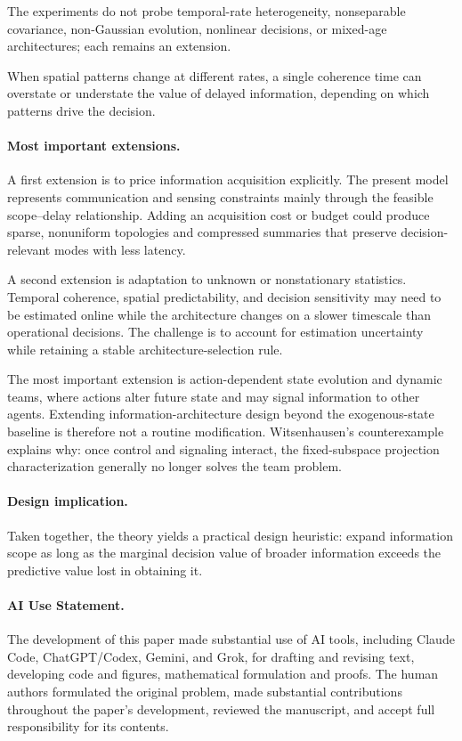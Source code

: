 \documentclass[11pt]{article}
\begin{document}
The experiments do not probe temporal-rate heterogeneity, nonseparable
covariance, non-Gaussian evolution, nonlinear decisions, or mixed-age
architectures; each remains an extension.

When spatial patterns change at different rates, a single coherence time can
overstate or understate the value of delayed information, depending on which
patterns drive the decision.

\paragraph{Most important extensions.}
A first extension is to price information acquisition explicitly. The present
model represents communication and sensing constraints mainly through the
feasible scope--delay relationship. Adding an acquisition cost or budget could
produce sparse, nonuniform topologies and compressed summaries that preserve
decision-relevant modes with less latency.

A second extension is adaptation to unknown or nonstationary statistics.
Temporal coherence, spatial predictability, and decision sensitivity may need
to be estimated online while the architecture changes on a slower timescale
than operational decisions. The challenge is to account for estimation
uncertainty while retaining a stable architecture-selection rule.

The most important extension is action-dependent state evolution and dynamic
teams, where actions alter future state and may signal information to other
agents. Extending information-architecture design beyond the exogenous-state
baseline is therefore not a routine modification.
Witsenhausen's counterexample \cite{witsenhausen1968counterexample} explains
why: once control and signaling interact, the fixed-subspace projection
characterization generally no longer solves the team problem.

\paragraph{Design implication.}
Taken together, the theory yields a practical design heuristic: expand
information scope as long as the marginal decision value of broader information
exceeds the predictive value lost in obtaining it.

\paragraph{AI Use Statement.}
The development of this paper made substantial use of AI tools, including
Claude Code, ChatGPT/Codex, Gemini, and Grok, for drafting and revising text,
developing code and figures, mathematical formulation and proofs.
The human authors formulated the original problem, made substantial
contributions throughout the paper's development, reviewed the manuscript, and
accept full responsibility for its contents.
\end{document}
